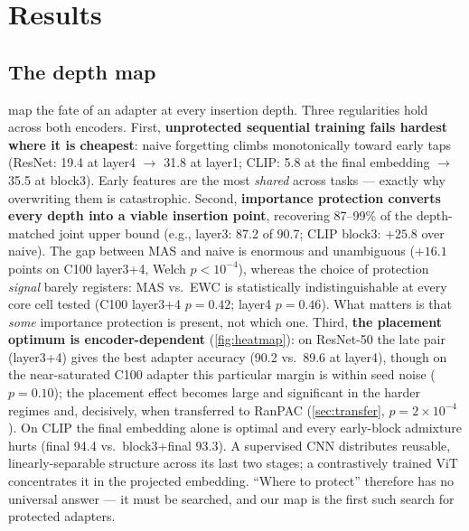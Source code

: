 \documentclass{article} %
\begin{document}
\section{Results}
\subsection{The depth map}
\label{sec:depthmap}
 map the fate of an adapter at
every insertion depth. Three regularities hold across both encoders. First,
\textbf{unprotected sequential training fails hardest where it is cheapest}:
naive forgetting climbs monotonically toward early taps (ResNet: 19.4 at
layer4 $\to$ 31.8 at layer1; CLIP: 5.8 at the final embedding $\to$ 35.5 at
block3). Early features are the most \emph{shared} across tasks --- exactly
why overwriting them is catastrophic. Second, \textbf{importance protection
converts every depth into a viable insertion point}, recovering 87--99\% of
the depth-matched joint upper bound (e.g., layer3: 87.2 of 90.7; CLIP block3:
$+25.8$ over naive). The gap between MAS and naive is enormous and
unambiguous ($+16.1$ points on C100 layer3+4, Welch $p<10^{-4}$), whereas the
choice of protection \emph{signal} barely registers: MAS vs.\ EWC is
statistically indistinguishable at every core cell tested (C100 layer3+4
$p{=}0.42$; layer4 $p{=}0.46$). What matters is that \emph{some} importance
protection is present, not which one. Third, \textbf{the placement optimum is
encoder-dependent} (\cref{fig:heatmap}): on ResNet-50 the late pair (layer3+4)
gives the best adapter accuracy (90.2 vs.\ 89.6 at layer4), though on the
near-saturated C100 adapter this particular margin is within seed noise
($p{=}0.10$); the placement effect becomes large and significant in the harder
regimes and, decisively, when transferred to RanPAC (\cref{sec:transfer},
$p{=}2{\times}10^{-4}$). On CLIP the final embedding alone is optimal and every
early-block admixture hurts (final 94.4 vs.\ block3+final 93.3). A supervised
CNN distributes reusable, linearly-separable structure across its last two
stages; a contrastively trained ViT concentrates it in the projected
embedding. ``Where to protect'' therefore has no universal answer --- it must
be searched, and our map is the first such search for protected adapters.
\end{document}

